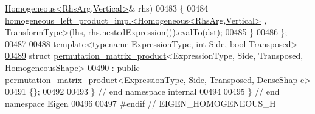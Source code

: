 \begin{DoxyCode}
      \hyperlink{group___geometry___module_class_eigen_1_1_homogeneous}{Homogeneous<RhsArg,Vertical>}& rhs)
00483   \{
00484     \hyperlink{struct_eigen_1_1internal_1_1homogeneous__left__product__impl}{homogeneous\_left\_product\_impl<Homogeneous<RhsArg,Vertical>}
      , TransformType>(lhs, rhs.nestedExpression()).evalTo(dst);
00485   \}
00486 \};
00487 
00488 \textcolor{keyword}{template}<\textcolor{keyword}{typename} ExpressionType, \textcolor{keywordtype}{int} S\textcolor{keywordtype}{id}e, \textcolor{keywordtype}{bool} Transposed>
\hyperlink{struct_eigen_1_1internal_1_1permutation__matrix__product_3_01_expression_type_00_01_side_00_01_t6e72df7be1755279b5abe7eabbb39875}{00489} \textcolor{keyword}{struct }\hyperlink{struct_eigen_1_1internal_1_1permutation__matrix__product}{permutation\_matrix\_product}<ExpressionType, Side, Transposed, 
      \hyperlink{struct_eigen_1_1_homogeneous_shape}{HomogeneousShape}>
00490   : \textcolor{keyword}{public} \hyperlink{struct_eigen_1_1internal_1_1permutation__matrix__product}{permutation\_matrix\_product}<ExpressionType, Side, Transposed, DenseShap
      e>
00491 \{\};
00492 
00493 \} \textcolor{comment}{// end namespace internal}
00494 
00495 \} \textcolor{comment}{// end namespace Eigen}
00496 
00497 \textcolor{preprocessor}{#endif // EIGEN\_HOMOGENEOUS\_H}
\end{DoxyCode}

